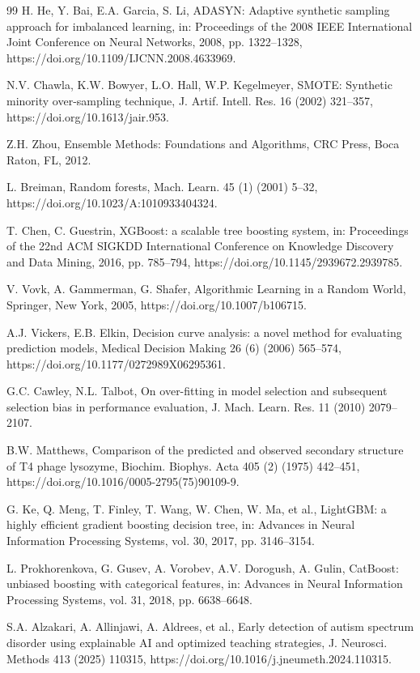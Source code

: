 \documentclass[pdflatex,sn-vancouver-num]{sn-jnl}
\begin{document}
\begin{thebibliography}{99}
H. He, Y. Bai, E.A. Garcia, S. Li, ADASYN: Adaptive synthetic sampling approach for imbalanced learning, in: Proceedings of the 2008 IEEE International Joint Conference on Neural Networks, 2008, pp. 1322--1328, https://doi.org/10.1109/IJCNN.2008.4633969.

N.V. Chawla, K.W. Bowyer, L.O. Hall, W.P. Kegelmeyer, SMOTE: Synthetic minority over-sampling technique, J. Artif. Intell. Res. 16 (2002) 321--357, https://doi.org/10.1613/jair.953.

Z.H. Zhou, Ensemble Methods: Foundations and Algorithms, CRC Press, Boca Raton, FL, 2012.

L. Breiman, Random forests, Mach. Learn. 45 (1) (2001) 5--32, https://doi.org/10.1023/A:1010933404324.

T. Chen, C. Guestrin, XGBoost: a scalable tree boosting system, in: Proceedings of the 22nd ACM SIGKDD International Conference on Knowledge Discovery and Data Mining, 2016, pp. 785--794, https://doi.org/10.1145/2939672.2939785.

V. Vovk, A. Gammerman, G. Shafer, Algorithmic Learning in a Random World, Springer, New York, 2005, https://doi.org/10.1007/b106715.

A.J. Vickers, E.B. Elkin, Decision curve analysis: a novel method for evaluating prediction models, Medical Decision Making 26 (6) (2006) 565--574, https://doi.org/10.1177/0272989X06295361.

G.C. Cawley, N.L. Talbot, On over-fitting in model selection and subsequent selection bias in performance evaluation, J. Mach. Learn. Res. 11 (2010) 2079--2107.

B.W. Matthews, Comparison of the predicted and observed secondary structure of T4 phage lysozyme, Biochim. Biophys. Acta 405 (2) (1975) 442--451, https://doi.org/10.1016/0005-2795(75)90109-9.

G. Ke, Q. Meng, T. Finley, T. Wang, W. Chen, W. Ma, et al., LightGBM: a highly efficient gradient boosting decision tree, in: Advances in Neural Information Processing Systems, vol. 30, 2017, pp. 3146--3154.

L. Prokhorenkova, G. Gusev, A. Vorobev, A.V. Dorogush, A. Gulin, CatBoost: unbiased boosting with categorical features, in: Advances in Neural Information Processing Systems, vol. 31, 2018, pp. 6638--6648.

S.A. Alzakari, A. Allinjawi, A. Aldrees, et al., Early detection of autism spectrum disorder using explainable AI and optimized teaching strategies, J. Neurosci. Methods 413 (2025) 110315, https://doi.org/10.1016/j.jneumeth.2024.110315.


\end{thebibliography}
\end{document}
